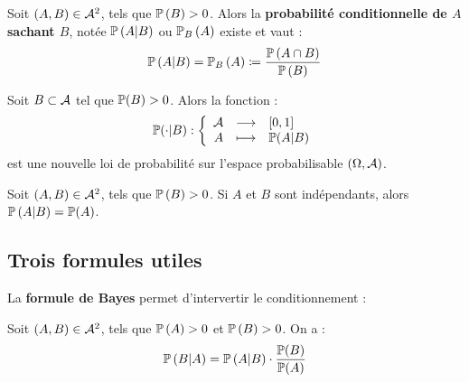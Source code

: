 \documentclass[../integ-proba.tex]{subfiles}
\begin{document}
    \begin{defi}
        Soit $\left( A,B \right) \in \mathcal{A}^2$, tels que $\mathbb{P}\left( B \right) > 0$.
        Alors la \textbf{probabilité conditionnelle de $A$ sachant $B$}, notée $\mathbb{P}\left( A | B \right)$ ou $\mathbb{P}_B\left( A \right)$ existe et vaut :
        \begin{displaymath}
            \mathbb{P}\left( A | B \right) = \mathbb{P}_B\left( A \right) \coloneqq \frac{\mathbb{P}\left( A \cap B \right)}{\mathbb{P}\left( B \right)}
        \end{displaymath}
    \end{defi}

    \begin{prop}
        Soit $B \subset \mathcal{A}$ tel que $\mathbb{P}(B) > 0$.
        Alors la fonction :
        \begin{displaymath}
            \mathbb{P}(\cdot | B) :
            \left\{
            \begin{array}{rcl}
                \mathcal{A} & \longrightarrow & [0,1] \\
                A  & \longmapsto     & \mathbb{P}(A | B)
            \end{array}
            \right.
        \end{displaymath}
        est une nouvelle loi de probabilité sur l'espace probabilisable $\left( \Omega, \mathcal{A} \right)$.
    \end{prop}

    \begin{prop}
        Soit $\left( A,B \right) \in \mathcal{A}^2$, tels que $\mathbb{P}\left( B \right) > 0$.
        Si $A$ et $B$ sont indépendants, alors $\mathbb{P}\left( A | B \right) = \mathbb{P}(A)$.
    \end{prop}

    \subsection{Trois formules utiles}

    La \textbf{formule de Bayes} permet d'intervertir le conditionnement :

    \begin{thm}
        Soit $\left( A,B \right) \in \mathcal{A}^2$, tels que $\mathbb{P}\left( A \right) > 0$ et $\mathbb{P}\left( B \right) > 0$.
        On a :
        \begin{displaymath}
            \mathbb{P} \left( B | A \right) = \mathbb{P}\left( A | B \right) \cdot \frac{\mathbb{P}(B)}{\mathbb{P}(A)}
        \end{displaymath}
    \end{thm}
\end{document}
